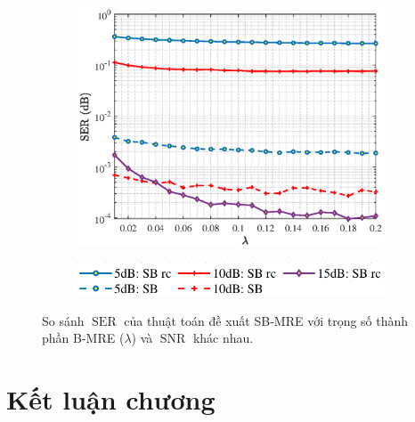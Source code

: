 \begin{figure}[ht]
    \centering
    \begin{subfigure}[b]{\textwidth}
         \centering
         \includegraphics[width=\linewidth]{figures/vary_lambda.eps}
     \end{subfigure}
     \hfill
     \begin{subfigure}[b]{0.7\textwidth}
         \centering
         \includegraphics[width=\linewidth]{figures/legend_1.pdf}
     \end{subfigure}
     \hfill
    \caption{So sánh $\operatorname{SER}$ của thuật toán đề xuất SB-MRE với trọng số thành phần B-MRE ($\lambda$) và $\operatorname{SNR}$ khác nhau.}
    \label{fig:vary_lambda}
\end{figure}

\section{Kết luận chương}

